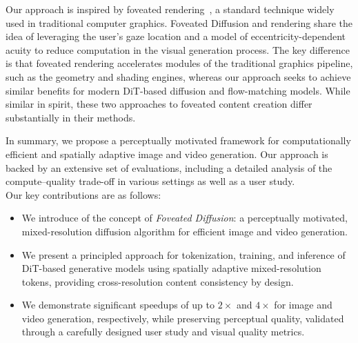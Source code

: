 Our approach is inspired by foveated rendering~\cite{geisler1998foveated,guenter2012foveated3d,patney2016gazeVR}, a standard technique widely used in traditional computer graphics. Foveated Diffusion and rendering share the idea of leveraging the user's gaze location and a model of eccentricity-dependent acuity to reduce computation in the visual generation process. The key difference is that foveated rendering accelerates modules of the traditional graphics pipeline, such as the geometry and shading engines, whereas our approach seeks to achieve similar benefits for modern DiT-based diffusion and flow-matching models. While similar in spirit, these two approaches to foveated content creation differ substantially in their methods. 

In summary, we propose a perceptually motivated framework for computationally efficient and spatially adaptive image and video generation. Our approach is backed by an extensive set of evaluations, including a detailed analysis of the compute--quality trade-off in various settings as well as a user study. \\
Our key contributions are as follows:
%
\begin{itemize}
    \item We introduce of the concept of \emph{Foveated Diffusion}: a perceptually motivated, mixed-resolution diffusion algorithm for efficient image and video generation.
    \item We present a principled approach for tokenization, training, and inference of DiT-based generative models using spatially adaptive mixed-resolution tokens, providing cross-resolution content consistency by design.
    \item We demonstrate significant speedups of up to $2\times$ and $4\times$ for image and video generation, respectively, while preserving perceptual quality, validated through a carefully designed user study and visual quality metrics.
\end{itemize}




\endinput

Most visual content is created to be observed by human users, making gaze-contingent content creation particularly important for immersive and interactive environments. 
% 
This motivates the adoption of human-vision-inspired creation strategies, most notably \emph{foveation}. 
% 
Modeled after the human eye’s fovea (the small, central portion of the retina responsible for sharp details), foveation \cite{guenter2012foveated3d} allows for high-acuity rendering in the gaze-centered region while intentionally utilizing lower-resolution or perceptually-equivalent content in the periphery. 
% 
By exploiting these biological constraints, foveated rendering greatly reduces the computational overhead and the number of pixels processed without compromising perceived visual quality.


